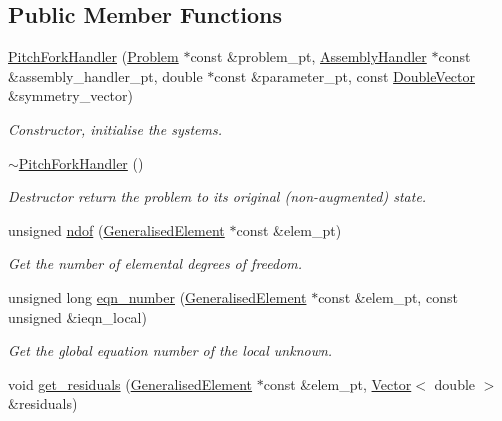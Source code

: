 \subsection*{Public Member Functions}
\begin{DoxyCompactItemize}
\item 
\hyperlink{classoomph_1_1PitchForkHandler_a96e0343c261d087f5d67a49f68561d96}{Pitch\+Fork\+Handler} (\hyperlink{classoomph_1_1Problem}{Problem} $\ast$const \&problem\+\_\+pt, \hyperlink{classoomph_1_1AssemblyHandler}{Assembly\+Handler} $\ast$const \&assembly\+\_\+handler\+\_\+pt, double $\ast$const \&parameter\+\_\+pt, const \hyperlink{classoomph_1_1DoubleVector}{Double\+Vector} \&symmetry\+\_\+vector)
\begin{DoxyCompactList}\small\item\em Constructor, initialise the systems. \end{DoxyCompactList}\item 
\hyperlink{classoomph_1_1PitchForkHandler_a69c6b0b6aedd03d828d295531fd61820}{$\sim$\+Pitch\+Fork\+Handler} ()
\begin{DoxyCompactList}\small\item\em Destructor return the problem to its original (non-\/augmented) state. \end{DoxyCompactList}\item 
unsigned \hyperlink{classoomph_1_1PitchForkHandler_ae066fa45e9f1bf10601286ca2d083a42}{ndof} (\hyperlink{classoomph_1_1GeneralisedElement}{Generalised\+Element} $\ast$const \&elem\+\_\+pt)
\begin{DoxyCompactList}\small\item\em Get the number of elemental degrees of freedom. \end{DoxyCompactList}\item 
unsigned long \hyperlink{classoomph_1_1PitchForkHandler_ab29e58e25bd5bebd836e30015f01ac8d}{eqn\+\_\+number} (\hyperlink{classoomph_1_1GeneralisedElement}{Generalised\+Element} $\ast$const \&elem\+\_\+pt, const unsigned \&ieqn\+\_\+local)
\begin{DoxyCompactList}\small\item\em Get the global equation number of the local unknown. \end{DoxyCompactList}\item 
void \hyperlink{classoomph_1_1PitchForkHandler_a461b24284da88b9489d720e484a6925c}{get\+\_\+residuals} (\hyperlink{classoomph_1_1GeneralisedElement}{Generalised\+Element} $\ast$const \&elem\+\_\+pt, \hyperlink{classoomph_1_1Vector}{Vector}$<$ double $>$ \&residuals)

\end{DoxyCompactItemize}
